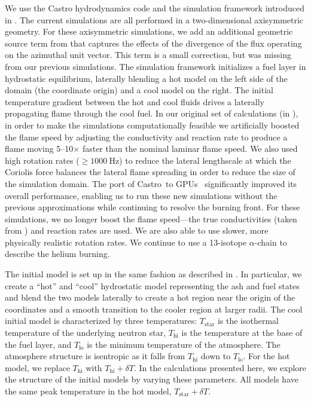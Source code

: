 \documentclass[preprint,times,tighten]{aastex63}
\newcommand{\castro}{{\sf Castro}}
\begin{document}
We use the Castro hydrodynamics code \citep{castro,castro_joss} and
the simulation framework introduced in \citet{flame_wave1}.  The
current simulations are all performed in a two-dimensional
axisymmetric geometry.  For these axisymmetric simulations, we add an
additional geometric source term from \citet{bernard-champmartin} that
captures the effects of the divergence of the flux operating on the
azimuthal unit vector.  This term is a small correction, but was
missing from our previous simulations.  The simulation framework
initializes a fuel layer in hydrostatic equilibrium, laterally
blending a hot model on the left side of the domain (the coordinate
origin) and a cool model on the right.  The initial temperature
gradient between the hot and cool fluids drives a laterally
propagating flame through the cool fuel.  In our original set of
calculations (in \citep{flame_wave1}), in order to make the 
simulations computationally feasible we artificially boosted the flame speed by adjusting the
conductivity and reaction rate to produce a flame moving 5--10$\times$
faster than the nominal laminar flame speed.  We also used high
rotation rates ($\geq 1000~\mathrm{Hz}$) to reduce the lateral lengthscale at which the Coriolis
force balances the lateral flame spreading in order to reduce the size 
of the simulation domain. The port of \castro\ to GPUs~\citep{sc20_gpu} 
significantly improved its overall performance, enabling
us to run these new simulations without the previous approximations while
continuing to resolve the burning front. For these
simulations, we no longer boost the flame speed---the true
conductivities (taken from \citealt{Timmes00}) and reaction rates are
used. We are also able to use slower, more physically realistic rotation rates.
  We continue to use a 13-isotope $\alpha$-chain to describe the
helium burning.  

The initial model is set up in the same fashion as described in
\citet{flame_wave1}.  In particular, we create a ``hot'' and ``cool''
hydrostatic model representing the ash and fuel states and blend the
two models laterally to create a hot region near the origin of the
coordinates and a smooth transition to the cooler region at larger
radii.  The cool initial model is characterized by three temperatures:
$T_\mathrm{star}$ is the isothermal temperature of the underlying
neutron star, $T_\mathrm{hi}$ is the temperature at the base of the
fuel layer, and $T_\mathrm{lo}$ is the minimum temperature of the
atmosphere. The atmosphere structure is isentropic as it falls from
$T_\mathrm{hi}$ down to $T_\mathrm{lo}$.  For the hot model, we
replace $T_\mathrm{hi}$ with $T_\mathrm{hi} + \delta T$.  In the
calculations presented here, we explore the structure of the initial
models by varying these parameters.  All models have the same
peak temperature in the hot model, $T_\mathrm{star} + \delta T$.
\end{document}
